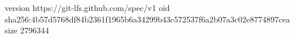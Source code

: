 version https://git-lfs.github.com/spec/v1
oid sha256:4b57d5768df84b2361f1965b6a34299b43c572537f6a2b07a3c02e8774897cea
size 2796344
